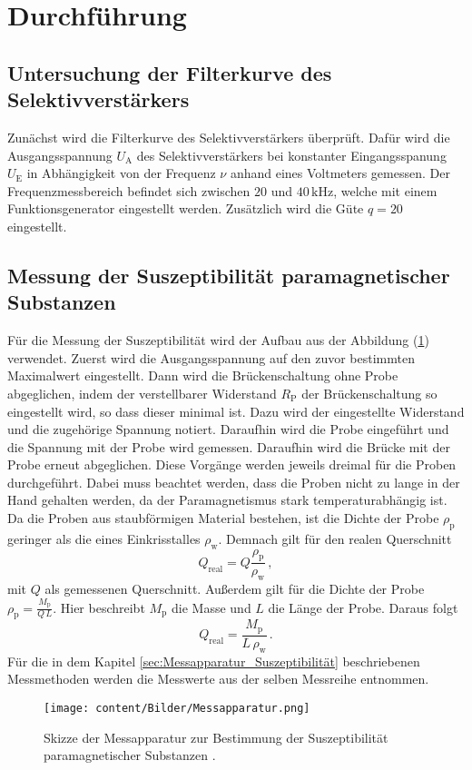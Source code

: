 \section{Durchführung}
\label{sec:Durchführung}
\subsection{Untersuchung der Filterkurve des Selektivverstärkers}
Zunächst wird die Filterkurve des Selektivverstärkers überprüft. Dafür wird die Ausgangsspannung $U_{\text{A}}$ des Selektivverstärkers bei 
konstanter Eingangsspanung $U_{\text{E}}$  in Abhängigkeit von der Frequenz $\nu$ anhand eines Voltmeters gemessen. Der Frequenzmessbereich befindet sich zwischen
$20$ und $40\,\unit{\kilo\hertz}$, welche mit einem Funktionsgenerator eingestellt werden. Zusätzlich wird die Güte $q=20$ eingestellt.

\subsection{Messung der Suszeptibilität paramagnetischer Substanzen}
Für die Messung der Suszeptibilität wird der Aufbau aus der Abbildung (\ref{fig:Messapparatur}) verwendet. Zuerst wird die Ausgangsspannung
auf den zuvor bestimmten Maximalwert eingestellt. Dann wird die Brückenschaltung ohne Probe abgeglichen, indem der verstellbarer Widerstand $R_{\text{P}}$
der Brückenschaltung so eingestellt wird, so dass dieser minimal ist. Dazu wird der eingestellte Widerstand und die zugehörige Spannung notiert. Daraufhin 
wird die Probe eingeführt und die Spannung mit der Probe wird gemessen. Daraufhin wird die Brücke mit der Probe erneut abgeglichen. Diese Vorgänge werden jeweils
dreimal für die Proben durchgeführt. Dabei muss beachtet werden, dass die Proben nicht zu lange in der Hand gehalten werden, da der Paramagnetismus stark temperaturabhängig ist.
Da die Proben aus staubförmigen Material bestehen, ist die Dichte der Probe $\rho _{\text{p}}$ geringer als die eines Einkrisstalles $\rho _{\text{w}}$. Demnach gilt für den realen Querschnitt 
\begin{equation}
    Q_{\text{real}}= Q \frac{\rho_{\text{p}}}{\rho_{\text{w}}}\,,
    \label{eqn:Querschnitt}
\end{equation}
mit $Q$ als gemessenen Querschnitt. Außerdem gilt für die Dichte der Probe $\rho_{\text{p}} = \frac{M_{\text{p}}}{Q\, L}$. Hier beschreibt $M_{\text{p}}$  die Masse und
$L$ die Länge der Probe. Daraus folgt
\begin{equation}
    Q_{\text{real}}= \frac{M_{\text{p}}}{L\,\rho_{\text{w}}}\,.
    \label{eqn:Querschnitt_Real}
\end{equation}
Für die in dem Kapitel \ref{sec:Messapparatur_Suszeptibilität}
beschriebenen Messmethoden werden die Messwerte aus der selben Messreihe entnommen. 
\begin{figure}[H]
    \centering
    \texttt{[image: content/Bilder/Messapparatur.png]}
    \caption{Skizze der Messapparatur zur Bestimmung der Suszeptibilität paramagnetischer Substanzen \cite{anleitungV606}.}
    \label{fig:Messapparatur}
\end{figure} 